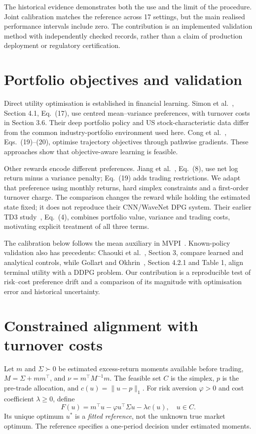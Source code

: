 \documentclass[sigconf,anonymous,review]{acmart}
\begin{document}
The historical evidence demonstrates both the use and the limit of the procedure. Joint calibration matches the reference across 17 settings, but the main realised performance intervals include zero. The contribution is an implemented validation method with independently checked records, rather than a claim of production deployment or regulatory certification.

\section{Portfolio objectives and validation}
Direct utility optimisation is established in financial learning. Simon et al.\ \cite{simon2026}, Section 4.1, Eq.\ (17), use centred mean--variance preferences, with turnover costs in Section 3.6. Their deep portfolio policy and US stock-characteristic data differ from the common industry-portfolio environment used here. Cong et al.\ \cite{cong2026}, Eqs.\ (19)--(20), optimise trajectory objectives through pathwise gradients. These approaches show that objective-aware learning is feasible.

Other rewards encode different preferences. Jiang et al.\ \cite{jiang2025}, Eq.\ (8), use net log return minus a variance penalty; Eq.\ (19) adds trading restrictions. We adapt that preference using monthly returns, hard simplex constraints and a first-order turnover charge. The comparison changes the reward while holding the estimated state fixed; it does not reproduce their CNN/WaveNet DPG system. Their earlier TD3 study\ \cite{jiang2024}, Eq.\ (4), combines portfolio value, variance and trading costs, motivating explicit treatment of all three terms.

The calibration below follows the mean auxiliary in MVPI\ \cite{zhang2021}. Known-policy validation also has precedents: Chaouki et al.\ \cite{chaouki2020}, Section 3, compare learned and analytical controls, while Gollart and Okhrin\ \cite{gollart2025}, Section 4.2.1 and Table 1, align terminal utility with a DDPG problem. Our contribution is a reproducible test of risk--cost preference drift and a comparison of its magnitude with optimisation error and historical uncertainty.

\section{Constrained alignment with turnover costs}
Let $m$ and $\Sigma\succ0$ be estimated excess-return moments available before trading, $M=\Sigma+mm^\top$, and $\nu=m^\top M^{-1}m$. The feasible set $C$ is the simplex, $p$ is the pre-trade allocation, and $c(u)=\|u-p\|_1$. For risk aversion $\varphi>0$ and cost coefficient $\lambda\ge0$, define
\begin{equation}\label{eq:target}
 F(u)=m^\top u-\varphi u^\top\Sigma u-\lambda c(u),\quad u\in C.
\end{equation}
Its unique optimum $u^*$ is a \emph{fitted reference}, not the unknown true market optimum. The reference specifies a one-period decision under estimated moments.
\end{document}
